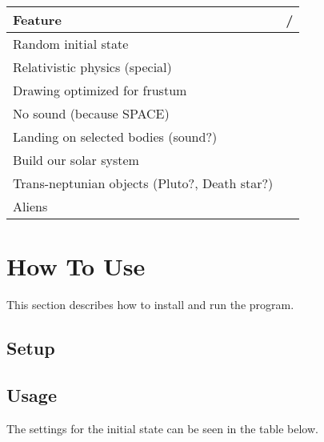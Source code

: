 \documentclass[a4paper,12pt]{article} \usepackage{graphicx}
\newcommand{\cmark}{\ding{51}}%
\newcommand{\xmark}{\ding{55}}%
\begin{document}
\begin{center}
        \begin{tabular}[h]{|l|c|}
                \hline
                \textbf{Feature} & \cmark/\xmark \\
                \hline
                Random initial state & \cmark \\
                Relativistic physics (special) & \xmark \\
                Drawing optimized for frustum & \cmark \\
                No sound (because SPACE) & \cmark \\
                Landing on selected bodies (sound?) & \xmark \\
                Build our solar system & \cmark \\
                Trans-neptunian objects (Pluto?, Death star?) & \xmark \\
                Aliens & \xmark \\
                \hline
        \end{tabular}
\end{center}

\section{How To Use}
This section describes how to install and run the program.
\subsection{Setup}

\subsection{Usage}
The settings for the initial state can be seen in the table below.
\end{document}
